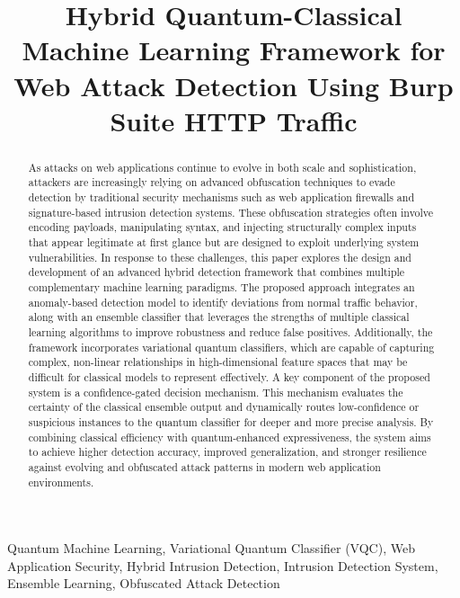 \documentclass[journal,onecolumn]{IEEEtran}
\begin{document}
\title{Hybrid Quantum-Classical Machine Learning Framework for Web Attack Detection Using Burp Suite HTTP Traffic}

\author{
}

\maketitle

\begin{abstract}
As attacks on web applications continue to evolve in both scale and sophistication, attackers are increasingly relying on advanced obfuscation techniques to evade detection by traditional security mechanisms such as web application firewalls and signature-based intrusion detection systems. These obfuscation strategies often involve encoding payloads, manipulating syntax, and injecting structurally complex inputs that appear legitimate at first glance but are designed to exploit underlying system vulnerabilities.
In response to these challenges, this paper explores the design and development of an advanced hybrid detection framework that combines multiple complementary machine learning paradigms. The proposed approach integrates an anomaly-based detection model to identify deviations from normal traffic behavior, along with an ensemble classifier that leverages the strengths of multiple classical learning algorithms to improve robustness and reduce false positives. Additionally, the framework incorporates variational quantum classifiers, which are capable of capturing complex, non-linear relationships in high-dimensional feature spaces that may be difficult for classical models to represent effectively.
A key component of the proposed system is a confidence-gated decision mechanism. This mechanism evaluates the certainty of the classical ensemble output and dynamically routes low-confidence or suspicious instances to the quantum classifier for deeper and more precise analysis. By combining classical efficiency with quantum-enhanced expressiveness, the system aims to achieve higher detection accuracy, improved generalization, and stronger resilience against evolving and obfuscated attack patterns in modern web application environments.
\end{abstract}

\begin{IEEEkeywords}
Quantum Machine Learning, Variational Quantum Classifier (VQC), Web Application Security, Hybrid Intrusion Detection, Intrusion Detection System, Ensemble Learning, Obfuscated Attack Detection
\end{IEEEkeywords}
\end{document}
